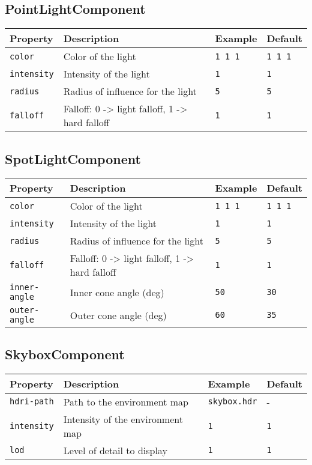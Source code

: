 \subsection{PointLightComponent}
\label{comp:PointLightComponent}
\begin{tabular}{|l|l|l|l|}
    \hline
    Property & Description & Example & Default \\ \hline
    \verb|color| & Color of the light & \verb|1 1 1| & \verb|1 1 1| \\ \hline
    \verb|intensity| & Intensity of the light & \verb|1| & \verb|1| \\ \hline
    \verb|radius| & Radius of influence for the light & \verb|5| & \verb|5| \\ \hline
    \verb|falloff| & Falloff: 0 -> light falloff, 1 -> hard falloff & \verb|1| & \verb|1| \\ \hline
\end{tabular}

\subsection{SpotLightComponent}
\label{comp:SpotLightComponent}
\begin{tabular}{|l|l|l|l|}
    \hline
    Property & Description & Example & Default \\ \hline
    \verb|color| & Color of the light & \verb|1 1 1| & \verb|1 1 1| \\ \hline
    \verb|intensity| & Intensity of the light & \verb|1| & \verb|1| \\ \hline
    \verb|radius| & Radius of influence for the light & \verb|5| & \verb|5| \\ \hline
    \verb|falloff| & Falloff: 0 -> light falloff, 1 -> hard falloff & \verb|1| & \verb|1| \\ \hline
    \verb|inner-angle| & Inner cone angle (deg) & \verb|50| & \verb|30| \\ \hline
    \verb|outer-angle| & Outer cone angle (deg) & \verb|60| & \verb|35| \\ \hline
\end{tabular}


\subsection{SkyboxComponent}
\label{comp:SkyboxComponent}
\begin{tabular}{|l|l|l|l|}
    \hline
    Property & Description & Example & Default \\ \hline
    \verb|hdri-path| & Path to the environment map & \verb|skybox.hdr| & - \\ \hline
    \verb|intensity| & Intensity of the environment map & \verb|1| & \verb|1| \\ \hline
    \verb|lod| & Level of detail to display & \verb|1| & \verb|1| \\ \hline
\end{tabular}


